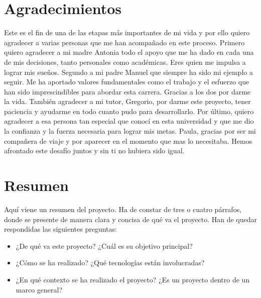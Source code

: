 \documentclass[a4paper, 12pt]{book}
\begin{document}
\chapter*{Agradecimientos}

Este es el fin de una de las etapas más importantes de mi vida y por ello quiero agradecer a varias personas que me han acompañado en este proceso.
Primero quiero agradecer a mi madre Antonia todo el apoyo que me ha dado en cada una de mis decisiones, tanto personales como académicas. Eres quien me impulsa a lograr mis sueños.
Segundo a mi padre Manuel que siempre ha sido mi ejemplo a seguir. Me ha aportado valores fundamentales como el trabajo y el esfuerzo que han sido imprescindibles para abordar esta carrera.
Gracias a los dos por darme la vida.
También agradecer a mi tutor, Gregorio, por darme este proyecto, tener paciencia  y ayudarme en todo cuanto pudo para desarrollarlo.
Por último, quiero agradecer a esa persona tan especial que conocí en esta universidad y que me dio la confianza y la fuerza necesaria para lograr mis metas. 
Paula, gracias por ser mi compañera de viaje y por aparecer en el momento que mas lo necesitaba. Hemos afrontado este desafío juntos y sin ti no hubiera sido igual.



\chapter*{Resumen}

Aquí viene un resumen del proyecto.
Ha de constar de tres o cuatro párrafos, donde se presente de manera clara y concisa de qué va el proyecto. 
Han de quedar respondidas las siguientes preguntas:

\begin{itemize}
  \item ¿De qué va este proyecto? ¿Cuál es su objetivo principal?
  \item ¿Cómo se ha realizado? ¿Qué tecnologías están involucradas?
  \item ¿En qué contexto se ha realizado el proyecto? ¿Es un proyecto dentro de un marco general?
\end{itemize}
\end{document}
